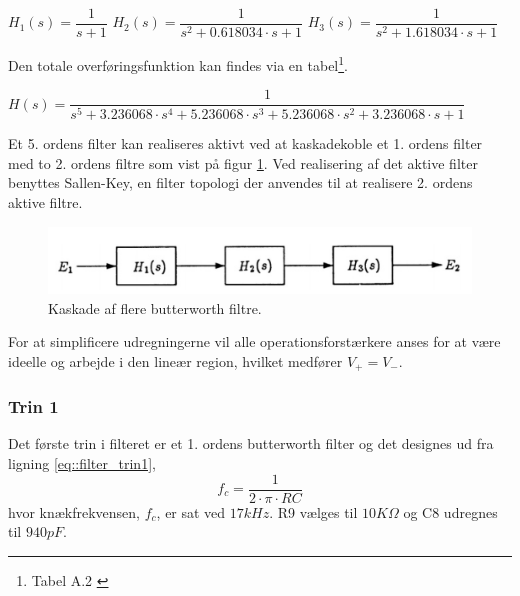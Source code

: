 \begin{center}
 $H_1(s) = \dfrac{1}{s+1}$ \hspace{1.5cm}
 $H_2(s) = \dfrac{1}{s^2 + 0.618034\cdot s + 1}$ \hspace{1.5cm}
 $H_3(s) = \dfrac{1}{s^2 + 1.618034\cdot s + 1}$
\end{center}

Den totale overføringsfunktion kan findes via en tabel\footnote{Tabel A.2 \cite[s. 378]{Su2002}}.\\ 
\begin{center}
 $H(s) = \dfrac{1}{s^5+3.236068\cdot s^4 + 5.236068\cdot s^3 + 5.236068\cdot s^2 + 3.236068\cdot s +1}$
\end{center}
Et 5. ordens filter kan realiseres aktivt ved at kaskadekoble et 1. ordens filter med to 2. ordens filtre som vist på figur  \ref{fig::anfilter_kask_butterworth}. Ved realisering af det aktive filter benyttes Sallen-Key, en filter topologi der anvendes til at realisere 2. ordens aktive filtre. 

\begin{figure}[h!]
	\centering
	\includegraphics[scale=0.7]{./billeder/Kaskade}
	\caption{Kaskade af flere butterworth filtre.}
	\label{fig::anfilter_kask_butterworth}
\end{figure}
\FloatBlock

For at simplificere udregningerne vil alle operationsforstærkere anses for at være ideelle og arbejde i den lineær region, hvilket medfører $V_+ = V_-$.

\subsubsection{Trin 1} 
Det første trin i filteret er et 1. ordens butterworth filter og det designes ud fra ligning \ref{eq::filter_trin1},
\begin{equation}
	f_c = \dfrac{1}{2\cdot\pi\cdot R C} \label{eq::filter_trin1}
\end{equation} 	
hvor knækfrekvensen, $f_c$, er sat ved $17kHz$.
R9 vælges til $10K\Omega$ og C8 udregnes til $940pF$.

